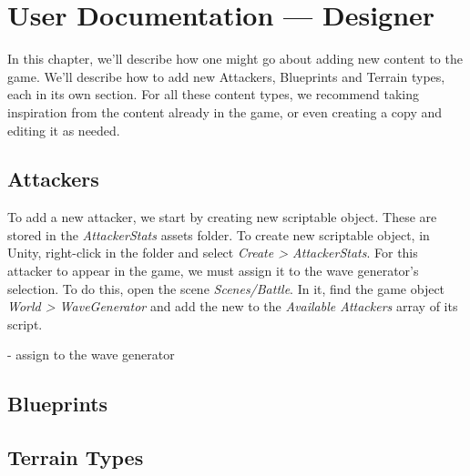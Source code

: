 \chapter{User Documentation --- Designer}

In this chapter, we'll describe how one might go about adding new content to the game.
We'll describe how to add new Attackers, Blueprints and Terrain types, each in its own section.
For all these content types, we recommend taking inspiration from the content already in the game, or even creating a copy and editing it as needed.

\section{Attackers}

To add a new attacker, we start by creating new  scriptable object.
These are stored in the \emph{AttackerStats} assets folder.
To create new  scriptable object, in Unity, right-click in the folder and select \emph{Create > AttackerStats}.
For this attacker to appear in the game, we must assign it to the wave generator's selection.
To do this, open the scene \emph{Scenes/Battle}.
In it, find the game object \emph{World > WaveGenerator} and add the new  to the \emph{Available Attackers} array of its  script.



- assign to the wave generator

\section{Blueprints}

\section{Terrain Types}